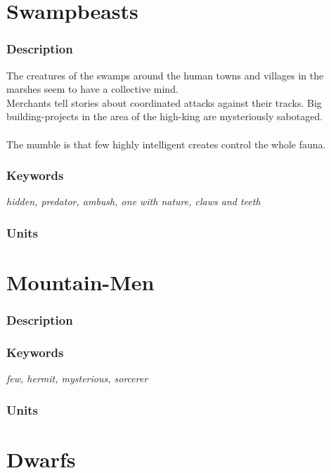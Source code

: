 \documentclass[a5paper,pagesize,10pt,bibtotoc,pointlessnumbers,
normalheadings,DIV=9,twoside=false]{scrbook}
\begin{document}
\newpage
\section{Swampbeasts}

\subsubsection{Description}
The creatures of the swamps around the human towns and villages in the marshes seem to have a collective mind.\\
Merchants tell stories about coordinated attacks against their tracks. Big building-projects in the area of the high-king are mysteriously sabotaged.\\
\\
The mumble is that few highly intelligent creates control the whole fauna.

\subsubsection{Keywords}
\emph{hidden, predator, ambush, one with nature, claws and teeth}

\subsubsection{Units}


\newpage
\section{Mountain-Men}

\subsubsection{Description}

\subsubsection{Keywords}
\emph{few, hermit, mysterious, sorcerer}

\subsubsection{Units}

\newpage
\section{Dwarfs}
\end{document}
